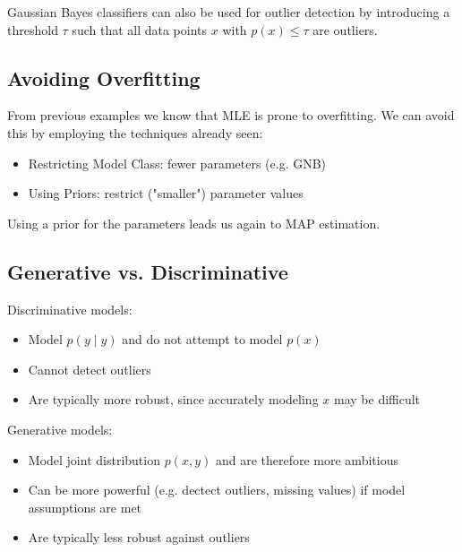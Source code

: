 Gaussian Bayes classifiers can also be used for outlier detection by introducing a threshold $\tau$ such that all data points $x$ with $p(x) \leq \tau$ are outliers.

\subsection{Avoiding Overfitting}

From previous examples we know that MLE is prone to overfitting. We can avoid this by employing the techniques already seen:
\begin{itemize}
	\item Restricting Model Class: fewer parameters (e.g. GNB)
	\item Using Priors: restrict ("smaller") parameter values
\end{itemize}

Using a prior for the parameters leads us again to MAP estimation.

\subsection{Generative vs. Discriminative}

Discriminative models:
\begin{itemize}
	\item Model $p(y \; | \; y)$ and do not attempt to model $p(x)$
	\item Cannot detect outliers
	\item Are typically more robust, since accurately modeling $x$ may be difficult
\end{itemize}

Generative models:
\begin{itemize}
	\item Model joint distribution $p(x,y)$ and are therefore more ambitious
	\item Can be more powerful (e.g. dectect outliers, missing values) if model assumptions are met
	\item Are typically less robust against outliers
\end{itemize}

